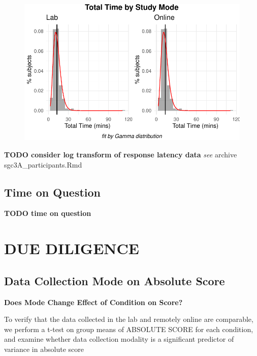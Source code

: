 \documentclass[
  letterpaper,
  DIV=11,
  numbers=noendperiod]{scrreprt}
\begin{document}
\begin{figure}[H]

{\centering \includegraphics{analysis/SGC3A/3_sgc3A_description_files/figure-pdf/label - VIS-TOTALTIMEmessage - falsewarning - false-1.pdf}

}

\end{figure}

\textbf{TODO consider log transform of response latency data} \emph{see}
archive sgc3A\_participants.Rmd

\hypertarget{time-on-question}{%
\subsection{Time on Question}\label{time-on-question}}

\textbf{TODO time on question}

\hypertarget{due-diligence}{%
\section{DUE DILIGENCE}\label{due-diligence}}

\hypertarget{data-collection-mode-on-absolute-score}{%
\subsection{Data Collection Mode on Absolute
Score}\label{data-collection-mode-on-absolute-score}}

\textbf{Does Mode Change Effect of Condition on Score?}

To verify that the data collected in the lab and remotely online are
comparable, we perform a t-test on group means of ABSOLUTE SCORE for
each condition, and examine whether data collection modality is a
significant predictor of variance in absolute score
\end{document}
